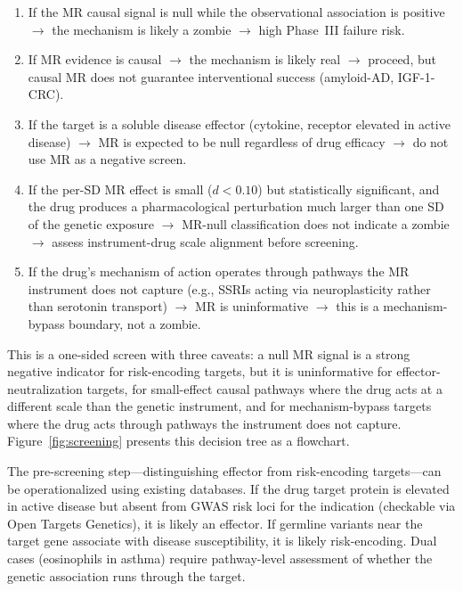 \documentclass[11pt]{article}
\begin{document}
\begin{enumerate}
\item If the MR causal signal is null while the observational association is positive $\to$ the mechanism is likely a zombie $\to$ high Phase~III failure risk.
\item If MR evidence is causal $\to$ the mechanism is likely real $\to$ proceed, but causal MR does not guarantee interventional success (amyloid-AD, IGF-1-CRC).
\item If the target is a soluble disease effector (cytokine, receptor elevated in active disease) $\to$ MR is expected to be null regardless of drug efficacy $\to$ do not use MR as a negative screen.
\item If the per-SD MR effect is small ($d < 0.10$) but statistically significant, and the drug produces a pharmacological perturbation much larger than one SD of the genetic exposure $\to$ MR-null classification does not indicate a zombie $\to$ assess instrument-drug scale alignment before screening.
\item If the drug's mechanism of action operates through pathways the MR instrument does not capture (e.g., SSRIs acting via neuroplasticity rather than serotonin transport) $\to$ MR is uninformative $\to$ this is a mechanism-bypass boundary, not a zombie.
\end{enumerate}

This is a one-sided screen with three caveats: a null MR signal is a strong negative indicator for risk-encoding targets, but it is uninformative for effector-neutralization targets, for small-effect causal pathways where the drug acts at a different scale than the genetic instrument, and for mechanism-bypass targets where the drug acts through pathways the instrument does not capture. Figure~\ref{fig:screening} presents this decision tree as a flowchart.

The pre-screening step---distinguishing effector from risk-encoding targets---can be operationalized using existing databases. If the drug target protein is elevated in active disease but absent from GWAS risk loci for the indication (checkable via Open Targets Genetics), it is likely an effector. If germline variants near the target gene associate with disease susceptibility, it is likely risk-encoding. Dual cases (eosinophils in asthma) require pathway-level assessment of whether the genetic association runs through the target.
\end{document}
